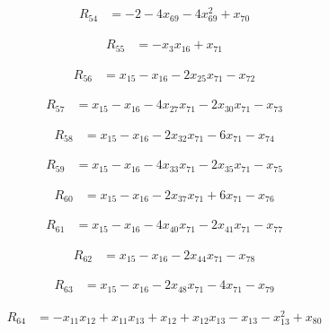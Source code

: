 \documentclass[11pt,letterpaper]{article}
\theoremstyle{definition}
\theoremstyle{remark}
\begin{document}
\begin{align*}
R_{54} &= -2 -4 x_{69} -4 x_{69}^{2} +x_{70}
\end{align*}

\begin{align*}
R_{55} &= -x_{3} x_{16} +x_{71}
\end{align*}

\begin{align*}
R_{56} &= x_{15} -x_{16} -2 x_{25} x_{71} -x_{72}
\end{align*}

\begin{align*}
R_{57} &= x_{15} -x_{16} -4 x_{27} x_{71} -2 x_{30} x_{71} -x_{73}
\end{align*}

\begin{align*}
R_{58} &= x_{15} -x_{16} -2 x_{32} x_{71} -6 x_{71} -x_{74}
\end{align*}

\begin{align*}
R_{59} &= x_{15} -x_{16} -4 x_{33} x_{71} -2 x_{35} x_{71} -x_{75}
\end{align*}

\begin{align*}
R_{60} &= x_{15} -x_{16} -2 x_{37} x_{71} +6 x_{71} -x_{76}
\end{align*}

\begin{align*}
R_{61} &= x_{15} -x_{16} -4 x_{40} x_{71} -2 x_{41} x_{71} -x_{77}
\end{align*}

\begin{align*}
R_{62} &= x_{15} -x_{16} -2 x_{44} x_{71} -x_{78}
\end{align*}

\begin{align*}
R_{63} &= x_{15} -x_{16} -2 x_{48} x_{71} -4 x_{71} -x_{79}
\end{align*}

\begin{align*}
R_{64} &= -x_{11} x_{12} +x_{11} x_{13} +x_{12} +x_{12} x_{13} -x_{13} -x_{13}^{2} +x_{80}
\end{align*}
\end{document}
